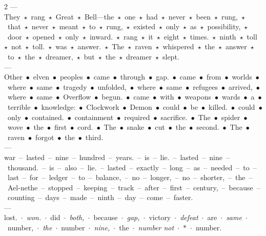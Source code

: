\documentclass[11pt,letterpaper,twoside]{book}
\begin{document}
\begin{multicols}{2}
---\\
They~\(\star\)~rang~\(\star\)~Great~\(\star\)~Bell---the~\(\star\)~one~\(\star\)~had~\(\star\)~never~\(\star\)~been~\(\star\)~rung,~\(\star\)~that~\(\star\)~never~\(\star\)~meant~\(\star\)~to~\(\star\)~rung,~\(\star\)~existed~\(\star\)~only~\(\star\)~as~\(\star\)~possibility,~\(\star\)~door~\(\star\)~opened~\(\star\)~only~\(\star\)~inward.~\(\star\)~rang~\(\star\)~it~\(\star\)~eight~\(\star\)~times.~\(\star\)~ninth~\(\star\)~toll~\(\star\)~not~\(\star\)~toll.~\(\star\)~was~\(\star\)~answer.~\(\star\)~The~\(\star\)~raven~\(\star\)~whispered~\(\star\)~the~\(\star\)~answer~\(\star\)~to~\(\star\)~the~\(\star\)~dreamer,~\(\star\)~but~\(\star\)~the~\(\star\)~dreamer~\(\star\)~slept.\\[0.5ex]
---\\
Other~\(\bullet\)~elven~\(\bullet\)~peoples~\(\bullet\)~came~\(\bullet\)~through~\(\bullet\)~gap.~\(\bullet\)~came~\(\bullet\)~from~\(\bullet\)~worlds~\(\bullet\)~where~\(\bullet\)~same~\(\bullet\)~tragedy~\(\bullet\)~unfolded,~\(\bullet\)~where~\(\bullet\)~same~\(\bullet\)~refugees~\(\bullet\)~arrived,~\(\bullet\)~where~\(\bullet\)~same~\(\bullet\)~Overflow~\(\bullet\)~begun.~\(\bullet\)~came~\(\bullet\)~with~\(\bullet\)~weapons~\(\bullet\)~wards~\(\bullet\)~a~\(\bullet\)~terrible~\(\bullet\)~knowledge:~\(\bullet\)~Clockwork~\(\bullet\)~Demon~\(\bullet\)~could~\(\bullet\)~be~\(\bullet\)~killed.~\(\bullet\)~could~\(\bullet\)~only~\(\bullet\)~contained.~\(\bullet\)~containment~\(\bullet\)~required~\(\bullet\)~sacrifice.~\(\bullet\)~The~\(\bullet\)~spider~\(\bullet\)~wove~\(\bullet\)~the~\(\bullet\)~first~\(\bullet\)~cord.~\(\bullet\)~The~\(\bullet\)~snake~\(\bullet\)~cut~\(\bullet\)~the~\(\bullet\)~second.~\(\bullet\)~The~\(\bullet\)~raven~\(\bullet\)~forgot~\(\bullet\)~the~\(\bullet\)~third.\\[0.5ex]
---\\
war~--~lasted~--~nine~--~hundred~--~years.~--~is~--~lie.~--~lasted~--~nine~--~thousand.~--~is~--~also~--~lie.~--~lasted~--~exactly~--~long~--~as~--~needed~--~to~--~last~--~for~--~ledger~--~to~--~balance,~--~no~--~longer,~--~no~--~shorter,~--~the~--~Ael-nethe~--~stopped~--~keeping~--~track~--~after~--~first~--~century,~--~because~--~counting~--~days~--~made~--~ninth~--~day~--~come~--~faster.\\[0.5ex]
---\\
lost.~$\cdot$~\textit{won.}~$\cdot$~did~$\cdot$~\textit{both,}~$\cdot$~because~$\cdot$~\textit{gap,}~$\cdot$~victory~$\cdot$~\textit{defeat}~$\cdot$~are~$\cdot$~\textit{same}~$\cdot$~number,~$\cdot$~\textit{the}~$\cdot$~number~$\cdot$~\textit{nine,}~$\cdot$~the~$\cdot$~\textit{number not}~$\cdot$~$*$~$\cdot$~number.\\[0.5ex]

\end{multicols}
\end{document}
